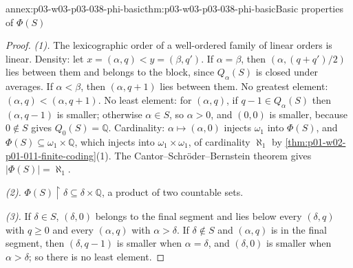 \begin{annexitem}{annex:p03-w03-p03-038-phi-basic}{thm:p03-w03-p03-038-phi-basic}{Basic properties of \(\Phi(S)\)}
\begin{proof}
\emph{(1).} The lexicographic order of a well-ordered family of linear orders
is linear. Density: let \(x=(\alpha,q)<y=(\beta,q')\). If \(\alpha=\beta\),
then \((\alpha,(q+q')/2)\) lies between them and belongs to the block, since
\(Q_\alpha(S)\) is closed under averages. If \(\alpha<\beta\), then
\((\alpha,q+1)\) lies between them. No greatest element: \((\alpha,q)<(\alpha,q+1)\).
No least element: for \((\alpha,q)\), if \(q-1\in Q_\alpha(S)\) then
\((\alpha,q-1)\) is smaller; otherwise \(\alpha\in S\), so \(\alpha>0\), and
\((0,0)\) is smaller, because \(0\notin S\) gives \(Q_0(S)=\mathbb Q\).
Cardinality: \(\alpha\mapsto(\alpha,0)\) injects \(\omega_1\) into
\(\Phi(S)\), and \(\Phi(S)\subseteq\omega_1\times\mathbb Q\), which injects into
\(\omega_1\times\omega_1\), of cardinality \(\aleph_1\) by
\cref{thm:p01-w02-p01-011-finite-coding}(1). The
Cantor--Schr\"oder--Bernstein theorem gives \(|\Phi(S)|=\aleph_1\).

\emph{(2).} \(\Phi(S)\mathbin{\upharpoonright}\delta\subseteq\delta\times\mathbb Q\),
a product of two countable sets.

\emph{(3).} If \(\delta\in S\), \((\delta,0)\) belongs to the final segment and
lies below every \((\delta,q)\) with \(q\ge0\) and every \((\alpha,q)\) with
\(\alpha>\delta\). If \(\delta\notin S\) and \((\alpha,q)\) is in the final
segment, then \((\delta,q-1)\) is smaller when \(\alpha=\delta\), and
\((\delta,0)\) is smaller when \(\alpha>\delta\); so there is no least element.
\end{proof}
\end{annexitem}


